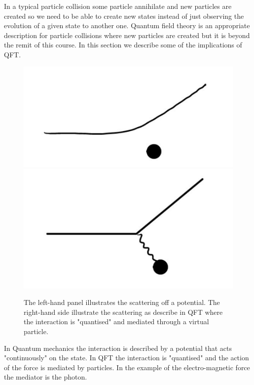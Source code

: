 \documentclass[12pt]{article}
\begin{document}
In a typical particle collision some particle annihilate and new particles are created so we need to be able to create new states instead of just observing the evolution of a given state to another one. Quantum field theory is an appropriate description for particle collisions where new particles are created but it is beyond the remit of this course. In this section we describe some of the implications of QFT. 

\begin{figure}
\begin{center}
\includegraphics[scale=0.2]{images/QM.png}  
\includegraphics[scale=0.2]{images/QFT.png}  
\end{center}
\caption{The left-hand panel illustrates the scattering off a potential. The right-hand side illustrate the scattering as describe in QFT where the interaction is "quantised" and mediated through a virtual particle.}\label{fig:QMvsQFT}
\end{figure}

In Quantum mechanics the interaction is described by a potential that acts "continuously" on the state. In QFT the interaction is "quantised" and the action of the force is mediated by particles. In the example of the electro-magnetic force the mediator is the photon. 
\end{document}
